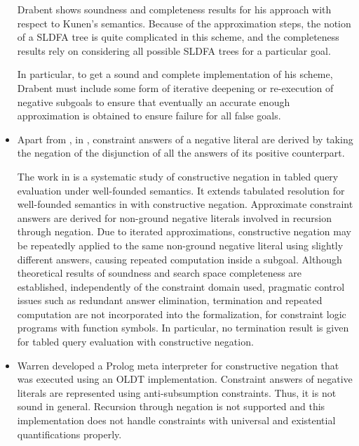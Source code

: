 \documentclass{tlp}
\begin{document}
\begin{itemize}
Drabent shows soundness and completeness results for his approach with
respect to Kunen's semantics. Because of the approximation steps, the
notion of a SLDFA tree is quite complicated in this scheme, and
the completeness results rely on considering all possible SLDFA trees
for a particular goal. 

In particular, to get a sound and complete
implementation of his scheme, Drabent must include some form of
iterative deepening or re-execution of negative subgoals to ensure
that eventually an accurate enough approximation is obtained to
ensure failure for all false goals.


\item Apart from \cite{Chan1,Chan2}, in
\cite{Bossu,Chan1,Damasio,Khabaza,Przymusinski2}, constraint answers
of a negative literal are derived by taking the negation of the
disjunction of all the answers of its positive counterpart.

The work in \cite{Damasio} is a systematic study of constructive
negation in tabled query evaluation under well-founded semantics. It
extends tabulated resolution for well-founded semantics in \cite{Bol}
with constructive negation. Approximate constraint answers are derived
for non-ground negative literals involved in recursion through
negation. Due to iterated approximations, constructive negation may be
repeatedly applied to the same non-ground negative literal using
slightly different answers, causing repeated computation inside a
subgoal. Although theoretical results of soundness and search space
completeness are established, independently of the constraint domain
used, pragmatic control issues such as redundant answer elimination,
termination and repeated computation are not incorporated into the
formalization, for constraint logic programs with function symbols. In
particular, no termination result is given for tabled query evaluation
with constructive negation.

\item Warren \cite{Warren92} developed a Prolog meta interpreter for
constructive negation that was executed using an OLDT
implementation. Constraint answers of negative literals are
represented using anti-subsumption constraints. Thus, it is not sound
in general. Recursion through negation is not supported and this
implementation does not handle constraints with universal and
existential quantifications properly.



\end{itemize}
\end{document}
